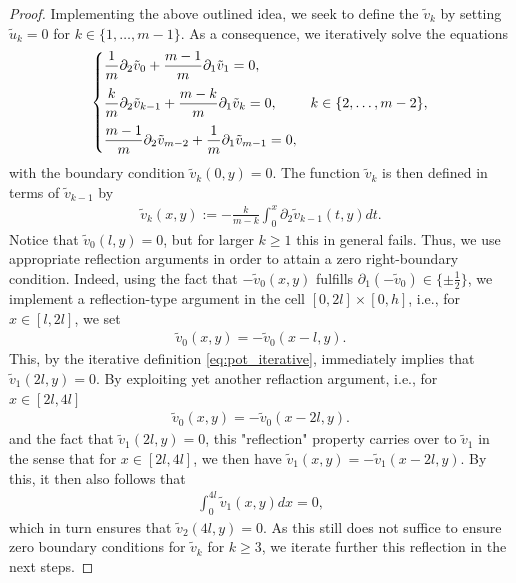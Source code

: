 \documentclass[a4paper, 10pt, twoside, notitlepage]{amsart}
\theoremstyle{plain}
\newcommand{\p}{\partial}
\begin{document}
\begin{proof}
                        
			Implementing the above outlined idea, we seek to define the $\tilde{v}_k$ by setting $\tilde{u}_k = 0$ for $k \in \{1,\dots,m-1\}$. As a consequence, we iteratively solve the equations
			\begin{align*} 
			\begin{cases}
				\displaystyle\vspace{1.5ex}
				\frac{1}{m} \p_2 \tilde{v}_0 + \frac{m-1}{m} \p_1 \tilde{v}_1 = 0, \\
				\displaystyle\vspace{1.5ex}
				\frac{k}{m} \p_2 \tilde{v}_{k-1} + \frac{m-k}{m} \p_1 \tilde{v}_k = 0, & k \in \{2,\dots,m-2\}, \\
				\displaystyle
				\frac{m-1}{m} \p_2 \tilde{v}_{m-2} + \frac{1}{m} \p_1 \tilde{v}_{m-1} = 0,
			\end{cases}
			\end{align*}
			with the boundary condition $\tilde{v}_k(0,y) = 0$.  The function $\tilde{v}_k$ is then defined in terms of $\tilde{v}_{k-1}$ by
			\begin{align}
			\label{eq:pot_iterative}
				\tilde{v}_k(x,y) := - \frac{k}{m-k} \int_{0}^x \p_2 \tilde{v}_{k-1}(t,y) dt.
			\end{align}
Notice that $\tilde{v}_0(l,y) = 0$, but for larger $k\ge1$ this in general fails. Thus, we use appropriate reflection arguments in order to attain a zero right-boundary condition.
                          Indeed, using the fact that $-\tilde{v}_0(x,y)$ fulfills $\p_1 (-\tilde{v}_0) \in \{\pm \frac{1}{2}\}$, we implement a reflection-type argument in the cell $[0,2l] \times [0,h]$, i.e., for $x \in [l,2l]$, we set
                          \begin{align*}
                            \tilde{v}_0(x,y) = -\tilde{v}_0(x-l,y).
                          \end{align*}
                          This, by the iterative definition \cref{eq:pot_iterative}, immediately implies that $\tilde v_1(2l,y)=0$.
By exploiting yet another reflaction argument, i.e., for $x \in [2l,4l]$
                          \begin{align*}
                            \tilde{v}_0(x,y) = -\tilde{v}_0(x-2l,y).
                          \end{align*}
and the fact that $\tilde v_1(2l,y)=0$, this "reflection" property carries over to $\tilde{v}_1$ in the sense that for $x \in [2l,4l]$, we then have $\tilde{v}_1(x,y) = -\tilde{v}_1(x-2l,y)$.
                          By this, it then also follows that
                          \begin{align*}
                            \int_0^{4l} \tilde{v}_1(x,y) dx = 0,
                          \end{align*}
which in turn ensures that $\tilde v_2(4l,y)=0$.
                          As this still does not suffice to ensure zero boundary conditions for $\tilde{v}_k$ for $k \geq 3$, we iterate further this reflection in the next steps.
                          

\end{proof}
\end{document}
